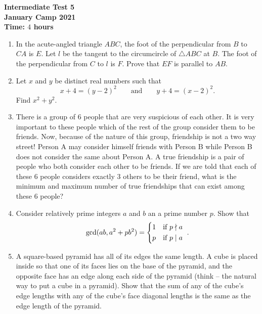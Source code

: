 \documentclass{article}
\begin{document}
\thispagestyle{empty}

\begin{center}
  \textbf{\Large Intermediate Test 5}
  \\ \vspace{1em}
  \textbf{\large January Camp 2021}
  \\ \vspace{1em}
  \textbf{\large Time: $4$ hours}
\end{center}

\vspace{12pt}

\begin{enumerate}[1.]

\item %
In the acute-angled triangle $ABC$, the foot of the perpendicular from $B$ to $CA$ is $E$. Let $l$ be the tangent to the circumcircle of $\triangle ABC$ at $B$. The foot of the perpendicular from $C$ to $l$ is $F$. Prove that $EF$ is parallel to $AB$.


\item %
Let $x$ and $y$ be distinct real numbers such that $$x + 4 = (y - 2)^2 \qquad\text{and}\qquad y + 4 = (x - 2)^2.$$
Find $x^2 + y^2$.


\item %
There is a group of 6 people that are very suspicious of each other. It is very important to these people which of the rest of the group consider them to be friends. Now, because of the nature of this group, friendship is not a two way street! Person A may consider himself friends with Person B while Person B does not consider the same about Person A. A true friendship is a pair of people who both consider each other to be friends. If we are told that each of these 6 people considers exactly 3 others to be their friend, what is the minimum and maximum number of true friendships that can exist among these 6 people?


\item %
Consider relatively prime integers $a$ and $b$ an a prime number $p$.
Show that
\[ \gcd(ab, a^2+pb^2) = \begin{cases*} 1 & if $p \nmid a$ \\ p & if $p \mid a$ \end{cases*}. \]


\item %
A square-based pyramid has all of its edges the same length.
A cube is placed inside so that one of its faces lies on the base of the pyramid, and the opposite face has an edge along each side of the pyramid (think -- the natural way to put a cube in a pyramid).
Show that the sum of any of the cube's edge lengths with any of the cube's face diagonal lengths is the same as the edge length of the pyramid.



\end{enumerate}
\end{document}
